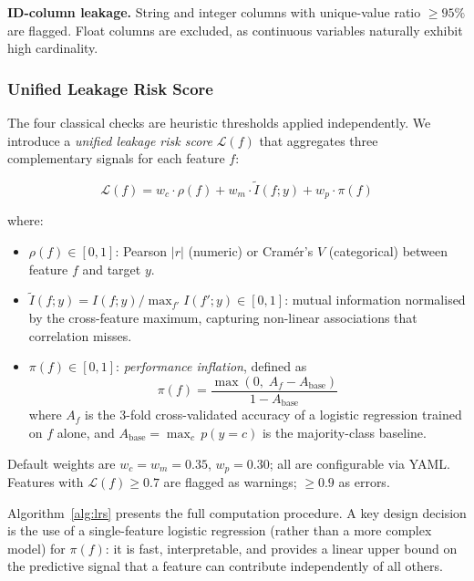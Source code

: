 \documentclass[11pt]{article}
\begin{document}
\textbf{ID-column leakage.}  String and integer columns with unique-value
ratio $\ge 95\%$ are flagged.  Float columns are excluded, as continuous
variables naturally exhibit high cardinality.

\subsubsection{Unified Leakage Risk Score}
\label{sec:lrs}

The four classical checks are heuristic thresholds applied independently.  We
introduce a \emph{unified leakage risk score} $\mathcal{L}(f)$ that aggregates
three complementary signals for each feature $f$:

\begin{equation}
  \mathcal{L}(f) = w_c \cdot \rho(f) + w_m \cdot \widetilde{I}(f;y) + w_p \cdot \pi(f)
  \label{eq:lrs}
\end{equation}

\noindent where:
\begin{itemize}[leftmargin=*,itemsep=2pt]
  \item $\rho(f) \in [0,1]$: Pearson $|r|$ (numeric) or Cram\'er's $V$
        (categorical) between feature $f$ and target $y$.
  \item $\widetilde{I}(f;y) = I(f;y) / \max_{f'} I(f';y) \in [0,1]$:
        mutual information normalised by the cross-feature maximum, capturing
        non-linear associations that correlation misses.
  \item $\pi(f) \in [0,1]$: \emph{performance inflation}, defined as
        \[
          \pi(f) = \frac{\max(0,\; A_f - A_{\text{base}})}{1 - A_{\text{base}}}
        \]
        where $A_f$ is the 3-fold cross-validated accuracy of a logistic
        regression trained on $f$ alone, and $A_{\text{base}} =
        \max_c\, p(y=c)$ is the majority-class baseline.
\end{itemize}

Default weights are $w_c = w_m = 0.35$, $w_p = 0.30$; all are configurable
via YAML.  Features with $\mathcal{L}(f) \ge 0.7$ are flagged as warnings;
$\ge 0.9$ as errors.

Algorithm~\ref{alg:lrs} presents the full computation procedure.  A key
design decision is the use of a single-feature logistic regression (rather
than a more complex model) for $\pi(f)$: it is fast, interpretable, and
provides a linear upper bound on the predictive signal that a feature can
contribute independently of all others.
\end{document}
